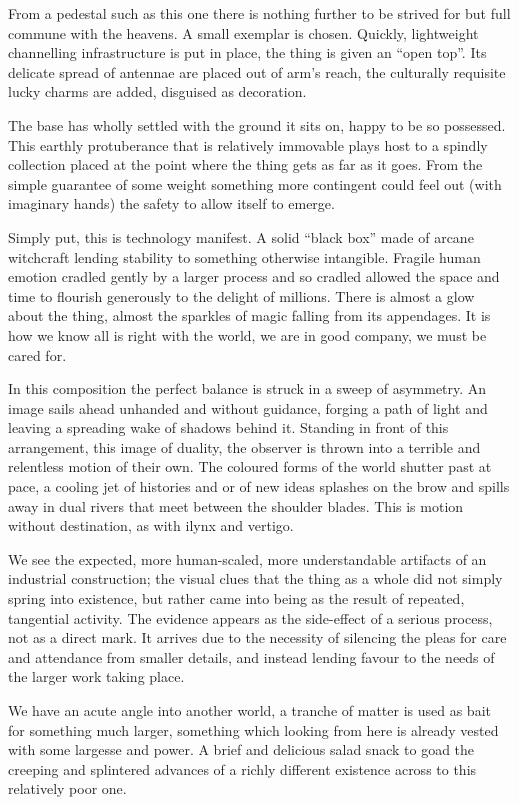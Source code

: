 \documentclass{book}
\begin{document}
From a pedestal such as this one there is nothing further to be strived for but
full commune with the heavens. A small exemplar is chosen. Quickly, lightweight
channelling infrastructure is put in place, the thing is given an ``open top''.
Its delicate spread of antennae are placed out of arm's reach, the culturally
requisite lucky charms are added, disguised as decoration.

The base has wholly settled with the ground it sits on, happy to be so
possessed. This earthly protuberance that is relatively immovable plays host to
a spindly collection placed at the point where the thing gets as far as it
goes. From the simple guarantee of some weight something more contingent could
feel out (with imaginary hands) the safety to allow itself to emerge.

Simply put, this is technology manifest. A solid ``black box'' made of arcane
witchcraft lending stability to something otherwise intangible. Fragile human
emotion cradled gently by a larger process and so cradled allowed the space and
time to flourish generously to the delight of millions. There is almost a glow
about the thing, almost the sparkles of magic falling from its appendages. It
is how we know all is right with the world, we are in good company, we must be
cared for.

In this composition the perfect balance is struck in a sweep of asymmetry. An
image sails ahead unhanded and without guidance, forging a path of light and
leaving a spreading wake of shadows behind it. Standing in front of this
arrangement, this image of duality, the observer is thrown into a terrible and
relentless motion of their own. The coloured forms of the world shutter past at
pace, a cooling jet of histories and or of new ideas splashes on the brow and
spills away in dual rivers that meet between the shoulder blades. This is
motion without destination, as with ilynx and vertigo.

We see the expected, more human-scaled, more understandable artifacts of an
industrial construction; the visual clues that the thing as a whole did not
simply spring into existence, but rather came into being as the result of
repeated, tangential activity. The evidence appears as the side-effect of a
serious process, not as a direct mark. It arrives due to the necessity of
silencing the pleas for care and attendance from smaller details, and instead
lending favour to the needs of the larger work taking place.

We have an acute angle into another world, a tranche of matter is used as bait
for something much larger, something which looking from here is already vested
with some largesse and power. A brief and delicious salad snack to goad the
creeping and splintered advances of a richly different existence across to this
relatively poor one.
\end{document}
